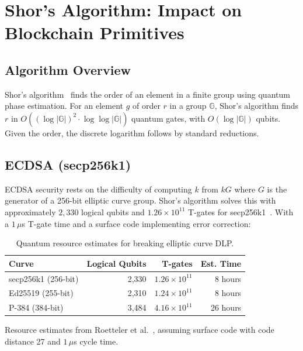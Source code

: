 \section{Shor's Algorithm: Impact on Blockchain Primitives}

\label{sec:shor}

\subsection{Algorithm Overview}

Shor's algorithm~\cite{shor1997} finds the order of an element in a finite group
using quantum phase estimation. For an element $g$ of order $r$ in a group
$\mathbb{G}$, Shor's algorithm finds $r$ in $O((\log |\mathbb{G}|)^2 \cdot \log\log |\mathbb{G}|)$
quantum gates, with $O(\log |\mathbb{G}|)$ qubits. Given the order, the discrete
logarithm follows by standard reductions.

\subsection{ECDSA (secp256k1)}

ECDSA security rests on the difficulty of computing $k$ from $kG$ where $G$ is the
generator of a 256-bit elliptic curve group. Shor's algorithm solves this with
approximately $2{,}330$ logical qubits and $1.26 \times 10^{11}$ T-gates for
secp256k1~\cite{roetteler2017quantum}. With a $1\,\mu$s T-gate time and a
surface code implementing error correction:

\begin{table}[ht]
\centering
\caption{Quantum resource estimates for breaking elliptic curve DLP.}
\label{tab:ecdsa-resources}
\begin{tabular}{lrrr}
\toprule
\textbf{Curve} & \textbf{Logical Qubits} & \textbf{T-gates} & \textbf{Est. Time} \\
\midrule
secp256k1 (256-bit) & 2{,}330 & $1.26 \times 10^{11}$ & 8 hours \\
Ed25519 (255-bit) & 2{,}310 & $1.24 \times 10^{11}$ & 8 hours \\
P-384 (384-bit) & 3{,}484 & $4.16 \times 10^{11}$ & 26 hours \\
\bottomrule
\end{tabular}
\vspace{0.3em}
\footnotesize{Resource estimates from Roetteler et al.~\cite{roetteler2017quantum},
assuming surface code with code distance 27 and $1\,\mu$s cycle time.}
\end{table}


